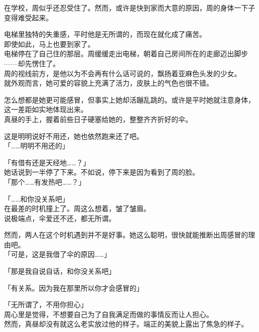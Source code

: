在学校，周似乎还忍受住了。然而，或许是快到家而大意的原因，周的身体一下子变得难受起来。

电梯里独特的失重感，平时他是无所谓的，而现在就化成了痛苦。\\

即使如此，马上也要到家了。\\

电梯停在了自己住的那层。周缓缓走出电梯，朝着自己房间所在的走廊迈出脚步——却先愣住了。\\

周的视线前方，是他以为不会再有什么话可说的，飘扬着亚麻色头发的少女。\\

就外观而言，她可爱的容貌上充满了活力，皮肤上的气色也很不错。

怎么想都是她更可能感冒，但事实上她却活蹦乱跳的。或许是平时她就注意身体，这一差距如实地体现出来。\\

真昼的手上，握着前些日子硬塞给她的，整整齐齐折好的伞。

这是明明说好不用还，她也依然跑来还了吧。\\

「……明明不用还的」

「有借有还是天经地……？」\\

她话说到一半停了下来。不如说，停下来是因为看到了周的脸。\\

「那个……有发热吧……？」

「……和你没关系吧」\\

在最差的时机撞上了。周这么想着，皱了皱眉。\\

说极端点，伞爱还不还，都无所谓。

然而，两人在这个时机遇到并不是好事。她这么聪明，很快就能推断出周感冒的理由吧。\\

「可是，这是我借了伞的原因……」

「那是我自说自话，和你没关系吧」

「有关系。因为我在那里所以你才会感冒的」

「无所谓了，不用你担心」\\

周心里是觉得，不想要自己为了自我满足而做的事情反而让人担心。\\

然而，真昼却没有就这么老实放过他的样子。端正的美貌上露出了焦急的样子。\\


